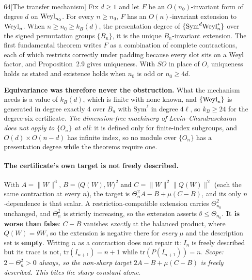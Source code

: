 \begin{Lem}{64}[The transfer mechanism]
Fix $d\ge1$ and let $F$ be an $O(n_0)$-invariant form of degree $d$ on $\mathrm{Weyl}_{n_0}$. For every $n\ge n_0$, $F$ has an $O(n)$-invariant extension to $\mathrm{Weyl}_n$. When $n\ge n_0\ge k_B(d)$, the presentation degree of $\{\mathrm{Sym}^d\mathrm{Weyl}_n^*\}$ over the signed permutation groups $\{B_n\}$, it is the unique $B_n$-invariant extension. The first fundamental theorem writes $F$ as a combination of complete contractions, each of which restricts correctly under padding because every slot sits on a Weyl factor, and Proposition~2.9 gives uniqueness. With $SO$ in place of $O$, uniqueness holds as stated and existence holds when $n_0$ is odd or $n_0\ge4d$.
\end{Lem}

\noindent\textbf{Equivariance was therefore never the obstruction.} What the mechanism needs is a value of $k_B(d)$, which is finite with none known, and $\{\mathrm{Weyl}_n\}$ is generated in degree exactly $4$ over $B_n$ with $\mathrm{Sym}^\ell$ in degree $4\ell$, so $k_B\ge24$ for the degree-six certificate. \emph{The dimension-free machinery of Levin--Chandrasekaran does not apply to $\{O_n\}$ at all}: it is defined only for finite-index subgroups, and $O(d)\times O(n-d)$ has infinite index, so no module over $\{O_n\}$ has a presentation degree while the theorems require one.

\paragraph{The certificate's own target is not freely described.} With $A=\lVert W\rVert^6$, $B=\langle Q(W),W\rangle^2$ and $C=\lVert W\rVert^2\lVert Q(W)\rVert^2$ (each the same contraction at every $n$), the target is $\Theta_n^2A-B+\mu(C-B)$, and its only $n$-dependence is that scalar. A restriction-compatible extension carries $\Theta_{n_0}^2$ unchanged, and $\Theta_n^2$ is strictly increasing, so the extension asserts $\theta\le\Theta_{n_0}$. \textbf{It is worse than false}: $C-B$ vanishes \emph{exactly} at the balanced product, where $Q(W)=\theta W$, so the extension is negative there for \emph{every} $\mu$ and the description set is \textbf{empty}. Writing $n$ as a contraction does not repair it: $I_n$ is freely described but its trace is not, $\mathrm{tr}(I_{n+1})=n+1$ while $\mathrm{tr}(P(I_{n+1}))=n$. \emph{Scope: $2-\Theta_n^2>0$ always, so the non-sharp target $2A-B+\mu(C-B)$ \emph{is} freely described. This bites the sharp constant alone.}

